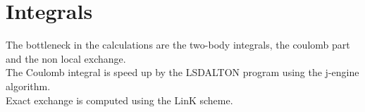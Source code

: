 \documentclass[12pt,a4paper,english]{beamer}
\newcommand{\braopket}[3]{\langle #1|#2|#3\rangle}
\begin{document}
\section{Integrals} \begin{frame} The bottleneck in the calculations are the
        two-body integrals, the coulomb part and the non local exchange. \\

        The Coulomb integral is speed up by the LSDALTON program using the 
        j-engine algorithm. \\

        Exact exchange is computed using the LinK scheme. 

\end{frame}


%
%
%
%  
%  
%
%
%

%
%
%  
\end{document}
